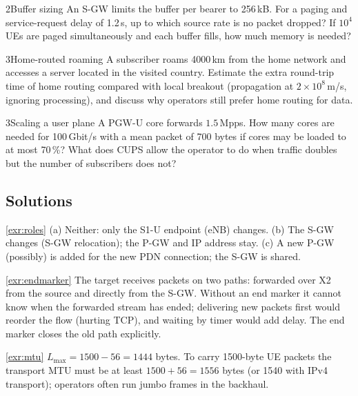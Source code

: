 \documentclass[11pt,a4paper]{article}
\begin{document}
\begin{exercisebox}{2}{Buffer sizing}\label{exr:buffer}
An S-GW limits the buffer per bearer to 256\,kB. For a paging and service-request delay of 1.2\,s, up to
which source rate is no packet dropped? If $10^4$ UEs are paged simultaneously and each buffer fills, how much
memory is needed?
\end{exercisebox}

\begin{exercisebox}{3}{Home-routed roaming}\label{exr:roaming}
A subscriber roams 4000\,km from the home network and accesses a server located in the visited country.
Estimate the extra round-trip time of home routing compared with local breakout (propagation at
$2\times10^8$\,m/s, ignoring processing), and discuss why operators still prefer home routing for data.
\end{exercisebox}

\begin{exercisebox}{3}{Scaling a user plane}\label{exr:cups}
A PGW-U core forwards $1.5$\,Mpps. How many cores are needed for 100\,Gbit/s with a mean packet of 700 bytes if
cores may be loaded to at most 70\,\%? What does CUPS allow the operator to do when traffic doubles but the
number of subscribers does not?
\end{exercisebox}

\subsection*{Solutions}

\begin{solutionbox}{\ref{exr:roles}}
(a) Neither: only the S1-U endpoint (eNB) changes. (b) The S-GW changes (S-GW relocation); the P-GW and IP address
stay. (c) A new P-GW (possibly) is added for the new PDN connection; the S-GW is shared.
\end{solutionbox}

\begin{solutionbox}{\ref{exr:endmarker}}
The target receives packets on two paths: forwarded over X2 from the source and directly from the S-GW. Without an
end marker it cannot know when the forwarded stream has ended; delivering new packets first would reorder the
flow (hurting TCP), and waiting by timer would add delay. The end marker closes the old path explicitly.
\end{solutionbox}

\begin{solutionbox}{\ref{exr:mtu}}
$L_{\max} = 1500 - 56 = 1444$ bytes. To carry 1500-byte UE packets the transport MTU must be at least
$1500 + 56 = 1556$ bytes (or 1540 with IPv4 transport); operators often run jumbo frames in the backhaul.
\end{solutionbox}
\end{document}
